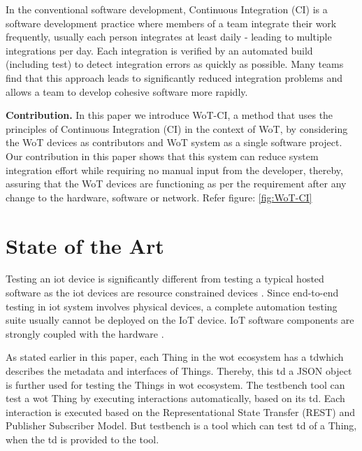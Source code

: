 \documentclass[conference]{IEEEtran}
\theoremstyle{definition}
\begin{document}
In the conventional software development, Continuous Integration (CI) is a software development practice where members of a team integrate their work frequently, usually each person integrates at least daily - leading to multiple integrations per day. 
Each integration is verified by an automated build (including test) to detect integration errors as quickly as possible. 
Many teams find that this approach leads to significantly reduced integration problems and allows a team to develop cohesive software more rapidly.\cite{fowler2006continuous}

\textbf{Contribution. }In this paper we introduce WoT-CI, a method that uses the principles of Continuous Integration (CI) in the context of WoT, by considering the WoT devices as contributors and WoT system as a single software project. 
Our contribution in this paper shows that this system can reduce system integration effort while requiring no manual input from the developer, thereby, assuring that the WoT devices are functioning as per the requirement after any change to the hardware, software or network. Refer figure: \ref{fig:WoT-CI}

\section{State of the Art}

Testing an \ac{iot} device is significantly different from testing a typical hosted software as the \ac{iot} devices are resource constrained devices \cite{bormann2014terminology}. 
Since end-to-end testing in \ac{iot} system involves physical devices, a complete automation testing suite usually cannot be deployed on the IoT device. 
IoT software components are strongly coupled with the hardware \cite{rosenkranz2015distributed}.

As stated earlier in this paper, each Thing in the \ac{wot} ecosystem has a \ac{td}which describes the metadata and interfaces of Things. 
Thereby, this \ac{td} a JSON object is further used for testing the Things in \ac{wot} ecosystem. 
The testbench tool can test a \ac{wot} Thing by executing interactions automatically, based on its \ac{td}. 
Each interaction is executed based on the Representational State Transfer (REST) and Publisher Subscriber Model. 
But testbench is a tool which can test \ac{td} of a Thing, when the \ac{td} is provided to the tool.
\end{document}
